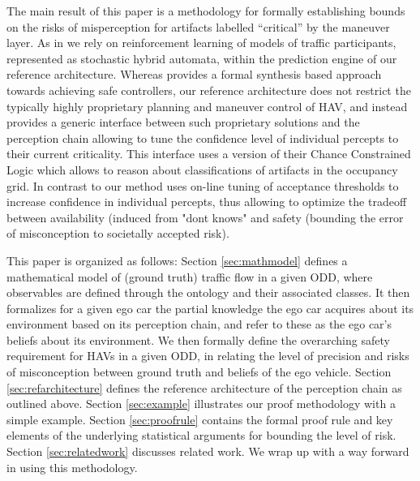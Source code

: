 The main result of this paper is a methodology for formally establishing bounds on the risks of misperception for artifacts labelled \enquote{critical} by the maneuver layer. As in \cite{VitusTomlinCDC2013,galbas} we rely on reinforcement learning of models of traffic participants, represented as stochastic hybrid automata, within the prediction engine of our reference architecture. Whereas \cite{synthesisPerception} provides a formal synthesis based approach towards achieving safe controllers, our reference architecture does not restrict the typically highly proprietary planning and maneuver control of HAV, and instead provides a generic interface between such proprietary solutions and the perception chain allowing to tune the confidence level of individual percepts to their current criticality. This interface uses a version of their Chance Constrained Logic which allows to reason about classifications of artifacts in the occupancy grid. In contrast to \cite{SeshiaNFM17} our method uses on-line tuning of acceptance thresholds to increase confidence in individual percepts, thus allowing to optimize the tradeoff between availability (induced from "dont knows" and safety (bounding the error of misconception to societally accepted risk).

This paper is organized as follows: 
Section \ref{sec:mathmodel} defines a mathematical model of (ground truth) traffic flow in a given ODD, where observables are defined through the ontology and their associated classes. It then formalizes for a given ego car the partial knowledge the ego car acquires about its environment based on its perception chain, and refer to these as the ego car's beliefs about its environment. We then formally define the overarching safety requirement for HAVs in a given ODD, in relating the level of precision and risks of misconception between ground truth and beliefs of the ego vehicle. Section \ref{sec:refarchitecture} defines the reference architecture of the perception chain as outlined above.
Section \ref{sec:example} illustrates our proof methodology with a simple example. Section \ref{sec:proofrule} contains the formal proof rule and key elements of the underlying statistical arguments for bounding the level of risk. Section \ref{sec:relatedwork} discusses related work. We wrap up with a way forward in using this methodology.


